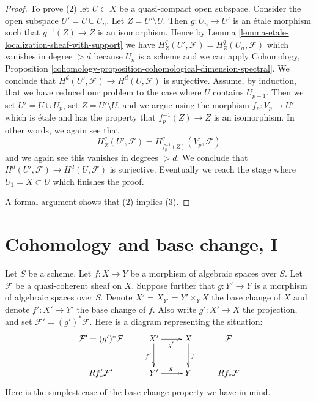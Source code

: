 \begin{proof}
\medskip\noindent
To prove (2) let $U \subset X$ be a quasi-compact open subspace.
Consider the open subspace $U' = U \cup U_n$. Let $Z = U' \setminus U$.
Then $g : U_n \to U'$ is an \'etale morphism such that
$g^{-1}(Z) \to Z$ is an isomorphism. Hence by
Lemma \ref{lemma-etale-localization-sheaf-with-support}
we have $H^q_Z(U', \mathcal{F}) = H^q_Z(U_n, \mathcal{F})$
which vanishes in degree $> d$ because $U_n$ is a scheme
and we can apply
Cohomology, Proposition
\ref{cohomology-proposition-cohomological-dimension-spectral}.
We conclude that $H^d(U', \mathcal{F}) \to H^d(U, \mathcal{F})$
is surjective. Assume, by induction, that we have reduced
our problem to the case where $U$ contains $U_{p + 1}$.
Then we set $U' = U \cup U_p$, set $Z = U' \setminus U$, and
we argue using the morphism $f_p : V_p \to U'$ which is \'etale
and has the property that $f_p^{-1}(Z) \to Z$ is an isomorphism.
In other words, we again see that
$$
H^q_Z(U', \mathcal{F}) = H^q_{f_p^{-1}(Z)}(V_p, \mathcal{F})
$$
and we again see this vanishes in degrees $> d$.
We conclude that $H^d(U', \mathcal{F}) \to H^d(U, \mathcal{F})$
is surjective. Eventually we reach the stage where $U_1 = X \subset U$
which finishes the proof.

\medskip\noindent
A formal argument shows that (2) implies (3).
\end{proof}








\section{Cohomology and base change, I}
\label{section-cohomology-and-base-change}

\noindent
Let $S$ be a scheme.
Let $f : X \to Y$ be a morphism of algebraic spaces over $S$.
Let $\mathcal{F}$ be a quasi-coherent sheaf on $X$.
Suppose further that $g : Y' \to Y$ is a morphism of algebraic spaces over
$S$. Denote $X' = X_{Y'} = Y' \times_Y X$ the base change of $X$ and denote
$f' : X' \to Y'$ the base change of $f$.
Also write $g' : X' \to X$ the projection,
and set $\mathcal{F}' = (g')^*\mathcal{F}$.
Here is a diagram representing the situation:
\begin{equation}
\label{equation-base-change-diagram}
\vcenter{
\xymatrix{
\mathcal{F}' = (g')^*\mathcal{F} &
X' \ar[r]_{g'} \ar[d]_{f'} &
X \ar[d]^f &
\mathcal{F} \\
Rf'_*\mathcal{F}' &
Y' \ar[r]^g &
Y &
Rf_*\mathcal{F}
}
}
\end{equation}
Here is the simplest case of the base change property we have in mind.

